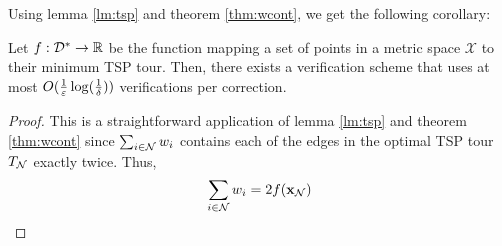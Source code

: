 Using lemma \ref{lm:tsp} and theorem \ref{thm:wcont}, we get the following corollary:

\begin{corollary}
    Let $f : \mathcal{D}^* \to \mathbb{R}$ be the function mapping a set of points in a metric space $\mathcal{X}$ to their minimum TSP tour. Then, there exists a
  verification scheme that uses at most $O(\frac{1}{\varepsilon}\log(\frac{1}{\delta}))$ verifications per correction.
\end{corollary}

\begin{proof}
This is a straightforward application of lemma \ref{lm:tsp} and theorem \ref{thm:wcont} since $\sum_{i\in \mathcal{N}} w_i$ contains each of the edges in the optimal TSP tour $T_{\mathcal{N}}$ exactly twice. Thus,
\[
\sum_{i\in \mathcal{N}} w_i=2f(\mathbf{x}_{\mathcal{N}})
\]
\end{proof}
